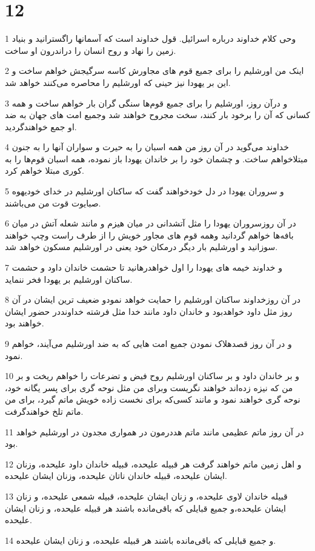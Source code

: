\chapter{12}

\par 1 وحی کلام خداوند درباره اسرائیل. قول خداوند است که آسمانها راگسترانید و بنیاد زمین را نهاد و روح انسان را دراندرون او ساخت.
\par 2 اینک من اورشلیم را برای جمیع قوم های مجاورش کاسه سرگیجش خواهم ساخت و این بر یهودا نیز حینی که اورشلیم را محاصره می‌کنند خواهد شد.
\par 3 و درآن روز، اورشلیم را برای جمیع قوم‌ها سنگی گران بار خواهم ساخت و همه کسانی که آن را برخود بار کنند، سخت مجروح خواهند شد وجمیع امت های جهان به ضد او جمع خواهندگردید.
\par 4 خداوند می‌گوید در آن روز من همه اسبان را به حیرت و سواران آنها را به جنون مبتلاخواهم ساخت. و چشمان خود را بر خاندان یهودا باز نموده، همه اسبان قوم‌ها را به کوری مبتلا خواهم کرد.
\par 5 و سروران یهودا در دل خودخواهند گفت که ساکنان اورشلیم در خدای خودیهوه صبایوت قوت من می‌باشند.
\par 6 در آن روزسروران یهودا را مثل آتشدانی در میان هیزم و مانند شعله آتش در میان بافه‌ها خواهم گردانید وهمه قوم های مجاور خویش را از طرف راست وچپ خواهند سوزانید و اورشلیم بار دیگر درمکان خود یعنی در اورشلیم مسکون خواهد شد.
\par 7 و خداوند خیمه های یهودا را اول خواهدرهانید تا حشمت خاندان داود و حشمت ساکنان اورشلیم بر یهودا فخر ننماید.
\par 8 در آن روزخداوند ساکنان اورشلیم را حمایت خواهد نمودو ضعیف ترین ایشان در آن روز مثل داود خواهدبود و خاندان داود مانند خدا مثل فرشته خداونددر حضور ایشان خواهند بود.
\par 9 و در آن روز قصدهلاک نمودن جمیع امت هایی که به ضد اورشلیم می‌آیند، خواهم نمود.
\par 10 و بر خاندان داود و بر ساکنان اورشلیم روح فیض و تضرعات را خواهم ریخت و بر من که نیزه زده‌اند خواهند نگریست وبرای من مثل نوحه گری برای پسر یگانه خود، نوحه گری خواهند نمود و مانند کسی‌که برای نخست زاده خویش ماتم گیرد، برای من ماتم تلخ خواهندگرفت.
\par 11 در آن روز ماتم عظیمی مانند ماتم هددرمون در همواری مجدون در اورشلیم خواهد بود.
\par 12 و اهل زمین ماتم خواهند گرفت هر قبیله علیحده، قبیله خاندان داود علیحده، وزنان ایشان علیحده، قبیله خاندان ناتان علیحده، وزنان ایشان علیحده.
\par 13 قبیله خاندان لاوی علیحده، و زنان ایشان علیحده، قبیله شمعی علیحده، و زنان ایشان علیحده،و جمیع قبایلی که باقی‌مانده باشند هر قبیله علیحده، و زنان ایشان علیحده.
\par 14 و جمیع قبایلی که باقی‌مانده باشند هر قبیله علیحده، و زنان ایشان علیحده.

